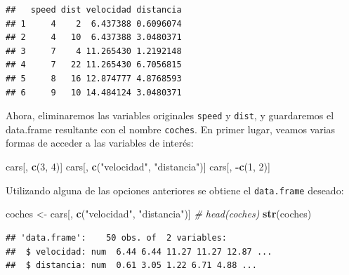 \documentclass[
]{book}
\newenvironment{Shaded}{\begin{snugshade}}{\end{snugshade}}
\newcommand{\CommentTok}[1]{\textcolor[rgb]{0.56,0.35,0.01}{\textit{#1}}}
\newcommand{\DecValTok}[1]{\textcolor[rgb]{0.00,0.00,0.81}{#1}}
\newcommand{\FloatTok}[1]{\textcolor[rgb]{0.00,0.00,0.81}{#1}}
\newcommand{\FunctionTok}[1]{\textcolor[rgb]{0.13,0.29,0.53}{\textbf{#1}}}
\newcommand{\NormalTok}[1]{#1}
\newcommand{\OtherTok}[1]{\textcolor[rgb]{0.56,0.35,0.01}{#1}}
\newcommand{\SpecialCharTok}[1]{\textcolor[rgb]{0.81,0.36,0.00}{\textbf{#1}}}
\newcommand{\StringTok}[1]{\textcolor[rgb]{0.31,0.60,0.02}{#1}}
\begin{document}
\begin{Shaded}
\end{Shaded}

\begin{verbatim}
##   speed dist velocidad distancia
## 1     4    2  6.437388 0.6096074
## 2     4   10  6.437388 3.0480371
## 3     7    4 11.265430 1.2192148
## 4     7   22 11.265430 6.7056815
## 5     8   16 12.874777 4.8768593
## 6     9   10 14.484124 3.0480371
\end{verbatim}

Ahora, eliminaremos las variables originales \texttt{speed} y
\texttt{dist}, y guardaremos el data.frame resultante con el nombre \texttt{coches}.
En primer lugar, veamos varias formas de acceder a las variables de
interés:

\begin{Shaded}
\begin{Highlighting}[]
\NormalTok{cars[, }\FunctionTok{c}\NormalTok{(}\DecValTok{3}\NormalTok{, }\DecValTok{4}\NormalTok{)]}
\NormalTok{cars[, }\FunctionTok{c}\NormalTok{(}\StringTok{"velocidad"}\NormalTok{, }\StringTok{"distancia"}\NormalTok{)]}
\NormalTok{cars[, }\SpecialCharTok{{-}}\FunctionTok{c}\NormalTok{(}\DecValTok{1}\NormalTok{, }\DecValTok{2}\NormalTok{)]}
\end{Highlighting}
\end{Shaded}

Utilizando alguna de las opciones anteriores se obtiene el \texttt{data.frame}
deseado:

\begin{Shaded}
\begin{Highlighting}[]
\NormalTok{coches }\OtherTok{\textless{}{-}}\NormalTok{ cars[, }\FunctionTok{c}\NormalTok{(}\StringTok{"velocidad"}\NormalTok{, }\StringTok{"distancia"}\NormalTok{)]}
\CommentTok{\# head(coches)}
\FunctionTok{str}\NormalTok{(coches)}
\end{Highlighting}
\end{Shaded}

\begin{verbatim}
## 'data.frame':    50 obs. of  2 variables:
##  $ velocidad: num  6.44 6.44 11.27 11.27 12.87 ...
##  $ distancia: num  0.61 3.05 1.22 6.71 4.88 ...
\end{verbatim}
\end{document}
